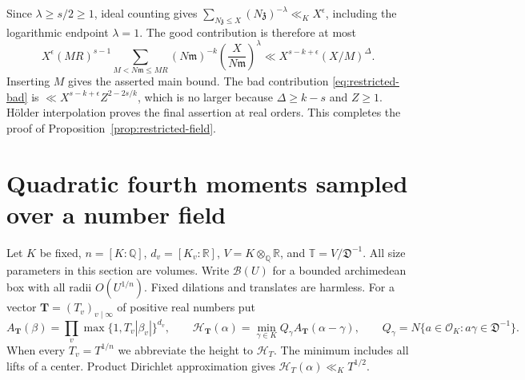 \documentclass[11pt,reqno]{amsart}
\numberwithin{equation}{section}
\theoremstyle{definition}
\begin{document}
Since $\lambda\ge s/2\ge1$, ideal counting gives
$\sum_{N\mathfrak z\le X}(N\mathfrak z)^{-\lambda}\ll_K X^\epsilon$,
including the logarithmic endpoint $\lambda=1$.
The good contribution is therefore at most
\[
 X^\epsilon(MR)^{s-1}
 \sum_{M<N\mathfrak m\le MR}(N\mathfrak m)^{-k}
             \left(\frac{X}{N\mathfrak m}\right)^\lambda
 \ll X^{s-k+\epsilon}(X/M)^\Delta.
\]
Inserting $M$ gives the asserted main bound.
The bad contribution \eqref{eq:restricted-bad} is
$\ll X^{s-k+\epsilon}Z^{2-2s/k}$, which is no larger because
$\Delta\ge k-s$ and $Z\ge1$.
H\"older interpolation proves the final assertion at real orders.
This completes the proof of Proposition~\ref{prop:restricted-field}.


\section{Quadratic fourth moments sampled over a number field}
\label{sec:quad-sampling-field}

Let $K$ be fixed, $n=[K:\mathbb Q]$, $d_v=[K_v:\mathbb R]$,
$V=K\otimes_{\mathbb Q}\mathbb R$, and
$\mathbb T=V/\mathfrak D^{-1}$. All size parameters in this section
are volumes. Write $\mathcal B(U)$ for a bounded archimedean box with
all radii $O(U^{1/n})$. Fixed dilations and translates are harmless.
For a vector $\mathbf T=(T_v)_{v\mid\infty}$ of positive real numbers put
\[
 A_{\mathbf T}(\beta)=\prod_v\max\{1,T_v|\beta_v|\}^{d_v},\qquad
 \mathcal H_{\mathbf T}(\alpha)=
       \min_{\gamma\in K} Q_\gamma A_{\mathbf T}(\alpha-\gamma),
 \qquad
 Q_\gamma=N\{a\in\mathcal O_K:a\gamma\in\mathfrak D^{-1}\}.
\]
When every $T_v=T^{1/n}$ we abbreviate the height to $\mathcal H_T$.
The minimum includes all lifts of a center. Product Dirichlet approximation
gives $\mathcal H_T(\alpha)\ll_K T^{1/2}$.
\end{document}
